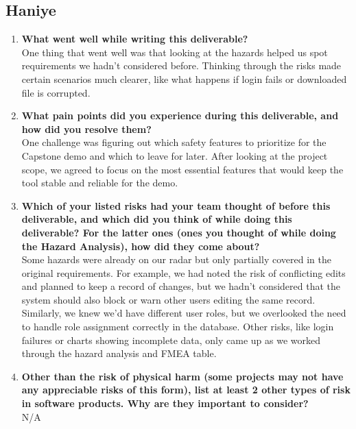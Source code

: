 \documentclass{article}
\begin{document}
\subsection*{Haniye}
\begin{enumerate}
    \item \textbf{What went well while writing this deliverable?}\\
    One thing that went well was that looking at the hazards helped us spot requirements we hadn’t considered before. Thinking through the risks made certain scenarios much clearer, like what happens if login fails or downloaded file is corrupted.
    \item \textbf{What pain points did you experience during this deliverable, and how
    did you resolve them?}\\
    One challenge was figuring out which safety features to prioritize for the Capstone demo and which to leave for later. After looking at the project scope, we agreed to focus on the most essential features that would keep the tool stable and reliable for the demo.
    \item \textbf{Which of your listed risks had your team thought of before this
    deliverable, and which did you think of while doing this deliverable? For
    the latter ones (ones you thought of while doing the Hazard Analysis), how
    did they come about?}\\
    Some hazards were already on our radar but only partially covered in the original requirements. For example, we had noted the risk of conflicting edits and planned to keep a record of changes, but we hadn’t considered that the system should also block or warn other users editing the same record. Similarly, we knew we’d have different user roles, but we overlooked the need to handle role assignment correctly in the database. Other risks, like login failures or charts showing incomplete data, only came up as we worked through the hazard analysis and FMEA table.
    \item \textbf{Other than the risk of physical harm (some projects may not have any
    appreciable risks of this form), list at least 2 other types of risk in
    software products. Why are they important to consider?} \\
    N/A
\end{enumerate}
\end{document}
